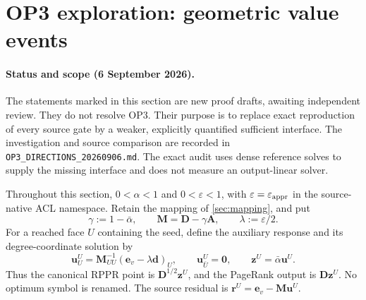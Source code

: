 \section{OP3 exploration: geometric value events}
\label{sec:op3-geometric-events}

\paragraph{Status and scope (6 September 2026).}
The statements marked \statusproved{} in this section are new proof drafts,
awaiting independent review. They do not resolve OP3. Their purpose is to
replace exact reproduction of every source gate by a weaker, explicitly
quantified sufficient interface. The investigation and source comparison are
recorded in \texttt{OP3\_DIRECTIONS\_20260906.md}. The exact audit uses dense
reference solves to supply the missing interface and does not measure an
output-linear solver.

Throughout this section, $0<\alpha<1$ and $0<\varepsilon<1$, with
$\varepsilon=\varepsilon_{\mathrm{appr}}$ in the source-native ACL namespace. Retain the
mapping of \cref{sec:mapping}, and put
\[
 \gamma:=1-\bar\alpha,\qquad
 \bm M=\bm D-\gamma \bm A,\qquad
 \lambda:=\varepsilon/2.
\]
For a reached face $U$ containing the seed, define the auxiliary response
and its degree-coordinate solution by
\begin{equation}
 \bm u^U_U=\bm M_{UU}^{-1}(\bm e_v-\lambda\bm d)_U,
 \qquad \bm u^U_{\bar U}=\bm0,
 \qquad \bm z^U=\bar\alpha\bm u^U.
 \label{eq:op3-scaled-response}
\end{equation}
Thus the canonical RPPR point is $\bm D^{1/2}\bm z^U$, and the PageRank
output is $\bm D\bm z^U$. No optimum symbol is renamed. The source residual is
$\bm r^U=\bm e_v-\bm M\bm u^U$.

